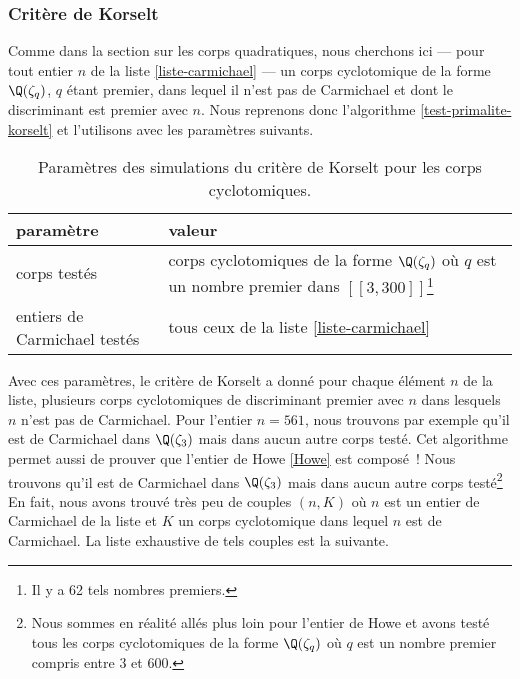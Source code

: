 \subsubsection{Critère de Korselt}

Comme dans la section sur les corps quadratiques, nous cherchons ici — pour tout entier $n$ de la liste \ref{liste-carmichael} — un corps cyclotomique de la forme $\Q(\zeta_q)$, $q$ étant premier, dans lequel il n'est pas de Carmichael et dont le discriminant est premier avec $n$. Nous reprenons donc l'algorithme \ref{test-primalite-korselt} et l'utilisons avec les paramètres suivants.

\begin{table}[H]\label{param-korselt-cyclo}
	\begin{center}
		\begin{tabularx}{\textwidth}{|Y|Y|}
			\hline
			paramètre & valeur \\
			\hline
			\hline
			corps testés & corps cyclotomiques de la forme $\Q(\zeta_q)$ où $q$ est un nombre premier dans $[\![3, 300]\!]$\footnote{Il y a 62 tels nombres premiers.} \\\hline
			entiers de Carmichael testés & tous ceux de la liste \ref{liste-carmichael} \\\hline
		\end{tabularx}
		\caption{Paramètres des simulations du critère de Korselt pour les corps cyclotomiques.}
	\end{center}
\end{table}

Avec ces paramètres, le critère de Korselt a donné pour chaque élément $n$ de la liste, plusieurs corps cyclotomiques de discriminant premier avec $n$ dans lesquels $n$ n'est pas de Carmichael. Pour l'entier $n = 561$, nous trouvons par exemple qu'il est de Carmichael dans $\Q(\zeta_3)$ mais dans aucun autre corps testé. Cet algorithme permet aussi de prouver que l'entier de Howe \ref{Howe} est composé~! Nous trouvons qu'il est de Carmichael dans $\Q(\zeta_3)$ mais dans aucun autre corps testé\footnote{Nous sommes en réalité allés plus loin pour l'entier de Howe et avons testé tous les corps cyclotomiques de la forme $\Q(\zeta_q)$ où $q$ est un nombre premier compris entre $3$ et $600$.} En fait, nous avons trouvé très peu de couples $(n, K)$ où $n$ est un entier de Carmichael de la liste et $K$ un corps cyclotomique dans lequel $n$ est de Carmichael. La liste exhaustive de tels couples est la suivante.

